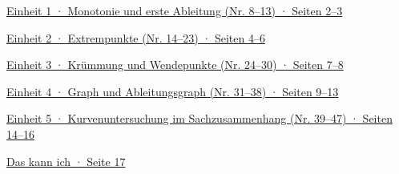 \documentclass[11pt]{article}
\newcommand{\verzeile}[2]{\noindent\hyperlink{#1}{#2}\par\medskip}
\def\SeEa{2–3}
\def\SeEb{4–6}
\def\SeEc{7–8}
\def\SeEd{9–13}
\def\SeEe{14–16}
\def\SeAbh{17}
\begin{document}
\verzeile{e1}{Einheit 1 · Monotonie und erste Ableitung (Nr. 8–13) · Seiten \SeEa}
\verzeile{e2}{Einheit 2 · Extrempunkte (Nr. 14–23) · Seiten \SeEb}
\verzeile{e3}{Einheit 3 · Krümmung und Wendepunkte (Nr. 24–30) · Seiten \SeEc}
\verzeile{e4}{Einheit 4 · Graph und Ableitungsgraph (Nr. 31–38) · Seiten \SeEd}
\verzeile{e5}{Einheit 5 · Kurvenuntersuchung im Sachzusammenhang (Nr. 39–47) · Seiten \SeEe}
\verzeile{abhaken}{Das kann ich · Seite \SeAbh}
\clearpage

\clearpage

\clearpage

\clearpage

\clearpage


\end{document}
